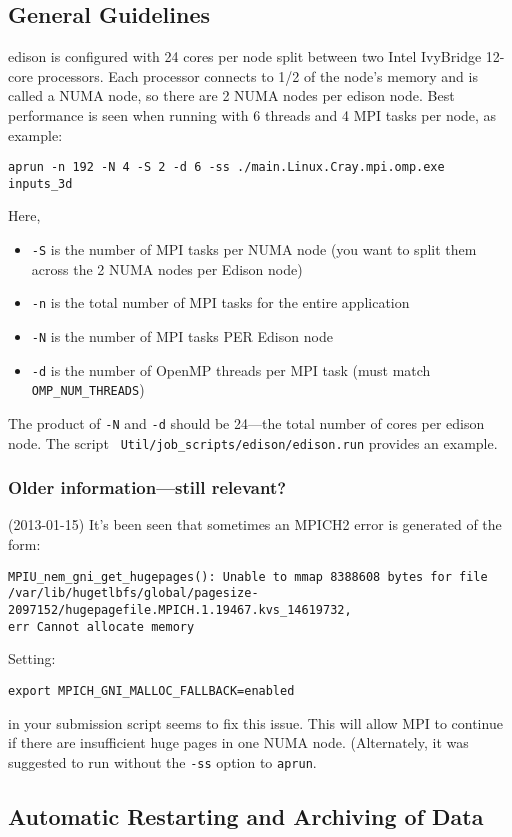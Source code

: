 \subsection{General Guidelines}

edison is configured with 24 cores per node split between two Intel IvyBridge
12-core processors.  Each processor connects to 1/2 of the node's memory
and is called a NUMA node, so there are 2 NUMA nodes per edison node.
Best performance is seen when
running with 6 threads and 4 MPI tasks per node, as example:
\begin{verbatim}
aprun -n 192 -N 4 -S 2 -d 6 -ss ./main.Linux.Cray.mpi.omp.exe inputs_3d
\end{verbatim}
Here,
\begin{itemize}
\item {\tt -S} is the number of MPI tasks per NUMA node (you want to split them
  across the 2 NUMA nodes per Edison node)
\item {\tt -n} is the total number of MPI tasks for the entire application
\item {\tt -N} is the number of MPI tasks PER Edison node
\item {\tt -d} is the number of OpenMP threads per MPI task (must match 
{\tt OMP\_NUM\_THREADS})
\end{itemize}
The product of {\tt -N} and {\tt -d} should be 24---the total number of cores
per edison node.
The script {\tt
Util/job\_scripts/edison/edison.run} provides an example.

\subsubsection{Older information---still relevant?}
\noindent (2013-01-15) It's been seen that sometimes an MPICH2 error is 
generated of the form:
\begin{verbatim}
MPIU_nem_gni_get_hugepages(): Unable to mmap 8388608 bytes for file 
/var/lib/hugetlbfs/global/pagesize-2097152/hugepagefile.MPICH.1.19467.kvs_14619732, 
err Cannot allocate memory
\end{verbatim}
Setting:
\begin{verbatim}
export MPICH_GNI_MALLOC_FALLBACK=enabled
\end{verbatim}
in your submission script seems to fix this issue.  This will allow
MPI to continue if there are insufficient huge pages in one NUMA node.
(Alternately, it was suggested to run without the {\tt -ss} option to
{\tt aprun}.

\subsection{Automatic Restarting and Archiving of Data}

